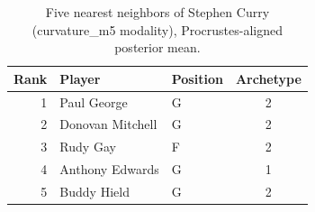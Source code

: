 \begin{table}[htbp]
  \centering\small
  \begin{tabular}{rllc}
    \toprule
    Rank & Player & Position & Archetype \\
    \midrule
    1 & Paul George & G & 2 \\
    2 & Donovan Mitchell & G & 2 \\
    3 & Rudy Gay & F & 2 \\
    4 & Anthony Edwards & G & 1 \\
    5 & Buddy Hield & G & 2 \\
    \bottomrule
  \end{tabular}
  \caption{Five nearest neighbors of Stephen Curry (curvature_m5 modality), Procrustes-aligned posterior mean.}
  \label{tab:Stephen_Curry_neighbors_curvature_m5}
\end{table}

